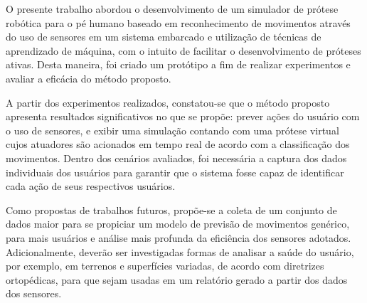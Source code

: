 O presente trabalho abordou o desenvolvimento de um simulador de prótese robótica para o pé humano baseado em reconhecimento de movimentos através do uso de sensores em um sistema embarcado e utilização de técnicas de aprendizado de máquina, com o intuito de facilitar o desenvolvimento de próteses ativas. Desta maneira, foi criado um protótipo a fim de realizar experimentos e avaliar a eficácia do método proposto.

A partir dos experimentos realizados, constatou-se que o método proposto apresenta resultados significativos no que se propõe: prever ações do usuário com o uso de sensores, e exibir uma simulação contando com uma prótese virtual cujos atuadores são acionados em tempo real de acordo com a classificação dos movimentos. Dentro dos cenários avaliados, foi necessária a captura dos dados individuais dos usuários para garantir que o sistema fosse capaz de identificar cada ação de seus respectivos usuários.

Como propostas de trabalhos futuros, propõe-se a coleta de um conjunto de dados maior para se propiciar um modelo de previsão de movimentos genérico, para mais usuários e análise mais profunda da eficiência dos sensores adotados. Adicionalmente, deverão ser investigadas formas de analisar a saúde do usuário, por exemplo, em terrenos e superfícies variadas, de acordo com diretrizes ortopédicas, para que sejam usadas em um relatório gerado a partir dos dados dos sensores.